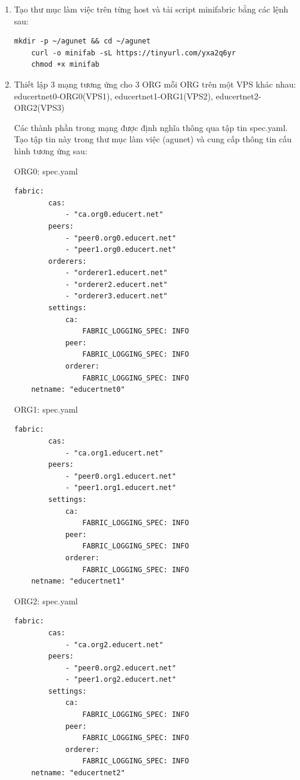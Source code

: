 \begin{enumerate}
    \item Tạo thư mục làm việc trên từng host và tải script minifabric bằng các lệnh sau:
    \begin{Verbatim}[fontsize=\small]
    mkdir -p ~/agunet && cd ~/agunet
    curl -o minifab -sL https://tinyurl.com/yxa2q6yr
    chmod +x minifab
    \end{Verbatim}

    \item Thiết lập 3 mạng tương ứng cho 3 ORG mỗi ORG trên một VPS khác nhau: educertnet0-ORG0(VPS1), educertnet1-ORG1(VPS2), educertnet2-ORG2(VPS3)

    Các thành phần trong mạng được định nghĩa thông qua tập tin spec.yaml. Tạo tập tin này trong thư mục làm việc (agunet) và cung cấp thông tin cấu hình tương ứng sau:
    
ORG0: spec.yaml
    \begin{Verbatim}[fontsize=\small]
    fabric:
        cas:
            - "ca.org0.educert.net"
        peers:
            - "peer0.org0.educert.net"
            - "peer1.org0.educert.net"
        orderers:
            - "orderer1.educert.net"
            - "orderer2.educert.net"
            - "orderer3.educert.net"
        settings:
            ca:
                FABRIC_LOGGING_SPEC: INFO
            peer:
                FABRIC_LOGGING_SPEC: INFO
            orderer:
                FABRIC_LOGGING_SPEC: INFO
    netname: "educertnet0"
    \end{Verbatim}

ORG1: spec.yaml
    \begin{Verbatim}[fontsize=\small]
    fabric:
        cas:
            - "ca.org1.educert.net"
        peers:
            - "peer0.org1.educert.net"
            - "peer1.org1.educert.net"
        settings:
            ca:
                FABRIC_LOGGING_SPEC: INFO
            peer:
                FABRIC_LOGGING_SPEC: INFO
            orderer:
                FABRIC_LOGGING_SPEC: INFO
    netname: "educertnet1"
    \end{Verbatim}

ORG2: spec.yaml
    \begin{Verbatim}[fontsize=\small]
    fabric:
        cas:
            - "ca.org2.educert.net"
        peers:
            - "peer0.org2.educert.net"
            - "peer1.org2.educert.net"
        settings:
            ca:
                FABRIC_LOGGING_SPEC: INFO
            peer:
                FABRIC_LOGGING_SPEC: INFO
            orderer:
                FABRIC_LOGGING_SPEC: INFO
    netname: "educertnet2"
    \end{Verbatim}


\end{enumerate}
